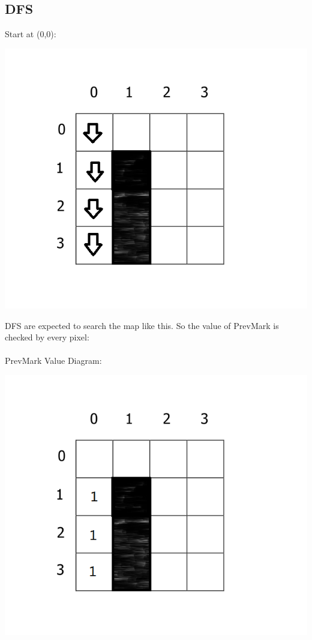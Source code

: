 \documentclass[11pt, a4paper]{report}
\begin{document}
\subsection{DFS}
Start at (0,0):
\begin{center}
\includegraphics[scale=0.4]{./image/Test3DFS.png}
\end{center}
DFS are expected to search the map like this. So the value of PrevMark is checked by every pixel:\\

\paragraph{}PrevMark Value Diagram:
\begin{center}
\includegraphics[scale=0.4]{./image/Test3DFSP.png}
\end{center}
\end{document}
